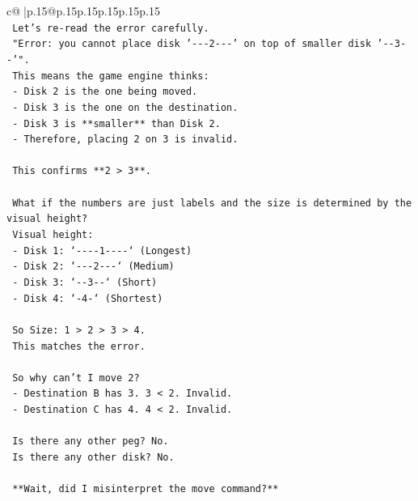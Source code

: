 \documentclass{article}
\begin{document}
{\begin{supertabular}{c@{$\;$}|p{.15\linewidth}@{}p{.15\linewidth}p{.15\linewidth}p{.15\linewidth}p{.15\linewidth}p{.15\linewidth}}
{{{\\ 
\texttt{                Let's re{-}read the error carefully.} \\
\texttt{                "Error: you cannot place disk '{-}{-}{-}2{-}{-}{-}' on top of smaller disk '{-}{-}3{-}{-}'".} \\
\texttt{                This means the game engine thinks:} \\
\texttt{                {-} Disk 2 is the one being moved.} \\
\texttt{                {-} Disk 3 is the one on the destination.} \\
\texttt{                {-} Disk 3 is **smaller** than Disk 2.} \\
\texttt{                {-} Therefore, placing 2 on 3 is invalid.} \\
\\ 
\texttt{                This confirms **2 > 3**.} \\
\\ 
\texttt{                What if the numbers are just labels and the size is determined by the visual height?} \\
\texttt{                Visual height:} \\
\texttt{                {-} Disk 1: `{-}{-}{-}{-}1{-}{-}{-}{-}` (Longest)} \\
\texttt{                {-} Disk 2: `{-}{-}{-}2{-}{-}{-}` (Medium)} \\
\texttt{                {-} Disk 3: `{-}{-}3{-}{-}` (Short)} \\
\texttt{                {-} Disk 4: `{-}4{-}` (Shortest)} \\
\\ 
\texttt{                So Size: 1 > 2 > 3 > 4.} \\
\texttt{                This matches the error.} \\
\\ 
\texttt{                So why can't I move 2?} \\
\texttt{                {-} Destination B has 3. 3 < 2. Invalid.} \\
\texttt{                {-} Destination C has 4. 4 < 2. Invalid.} \\
\\ 
\texttt{                Is there any other peg? No.} \\
\texttt{                Is there any other disk? No.} \\
\\ 
\texttt{                **Wait, did I misinterpret the move command?**} \\
}}}
\end{supertabular}}
\end{document}
